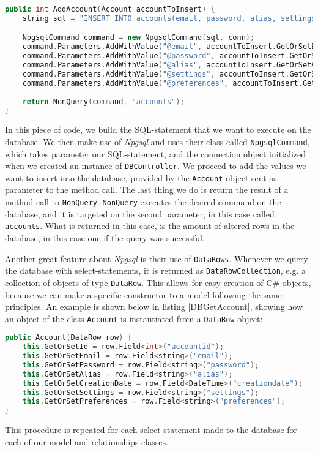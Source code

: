 \begin{lstlisting}[language=c++, label={lst:DBAddAccount}, caption=Adding a new Account to the Database]
public int AddAccount(Account accountToInsert) {
	string sql = "INSERT INTO accounts(email, password, alias, settings, preferences) VALUES (@email, @password, @alias, @settings, @preferences)";

	NpgsqlCommand command = new NpgsqlCommand(sql, conn);
	command.Parameters.AddWithValue("@email", accountToInsert.GetOrSetEmail);
	command.Parameters.AddWithValue("@password", accountToInsert.GetOrSetPassword);
	command.Parameters.AddWithValue("@alias", accountToInsert.GetOrSetAlias);
	command.Parameters.AddWithValue("@settings", accountToInsert.GetOrSetSettings);
	command.Parameters.AddWithValue("@preferences", accountToInsert.GetOrSetPreferences);
	
	return NonQuery(command, "accounts");
}
\end{lstlisting}

In this piece of code, we build the SQL-statement that we want to execute on the database. We then make use of \textit{Npgsql} and uses their class called \texttt{NpgsqlCommand}, which takes parameter our SQL-statement, and the connection object initialized when we created an instance of \texttt{DBController}. We proceed to add the values we want to insert into the database, provided by the \texttt{Account} object sent as parameter to the method call. The last thing we do is return the result of a method call to \texttt{NonQuery}. \texttt{NonQuery} executes the desired command on the database, and it is targeted on the second parameter, in this case called \texttt{accounts}. What is returned in this case, is the amount of altered rows in the database, in this case one if the query was successful.

Another great feature about \textit{Npgsql} is their use of \texttt{DataRows}\cite{datarow}. Whenever we query the database with select-statements, it is returned as \texttt{DataRowCollection}, e.g. a collection of objects of type \texttt{DataRow}. This allows for easy creation of C\# objects, because we can make a specific constructor to a model following the same principles. An example is shown below in listing \ref{DBGetAccount}, showing how an object of the class \texttt{Account} is instantiated from a \texttt{DataRow} object:

\begin{lstlisting}[language=c++, label={lst:DBGetAccount}, caption=Instantiating a new Account-object from a DataRow-object]
public Account(DataRow row) {
	this.GetOrSetId = row.Field<int>("accountid");
	this.GetOrSetEmail = row.Field<string>("email");
	this.GetOrSetPassword = row.Field<string>("password");
	this.GetOrSetAlias = row.Field<string>("alias");
	this.GetOrSetCreationDate = row.Field<DateTime>("creationdate");
	this.GetOrSetSettings = row.Field<string>("settings");
	this.GetOrSetPreferences = row.Field<string>("preferences");
}
\end{lstlisting}

This procedure is repeated for each select-statement made to the database for each of our model and relationships classes.


